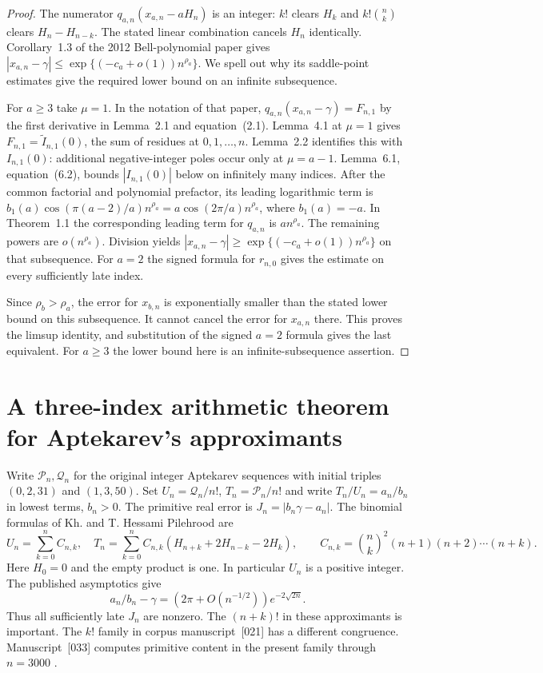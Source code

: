 \documentclass[11pt,a4paper,oneside,openany]{report}
\theoremstyle{remark}\newtheorem{remark}[theorem]{Remark}
\numberwithin{equation}{section}
\begin{document}
\begin{proof}
The numerator $q_{a,n}(x_{a,n}-aH_n)$ is an integer: $k!$
clears $H_k$ and $k!\binom nk$ clears $H_n-H_{n-k}$. The stated
linear combination cancels $H_n$ identically. Corollary~1.3 of the
2012 Bell-polynomial paper gives
$|x_{a,n}-\gamma|\le\exp\{(-c_a+o(1))n^{\rho_a}\}$.
We spell out why its saddle-point estimates give the required
lower bound on an infinite subsequence.

For $a\ge3$ take $\mu=1$. In the notation of that paper,
$q_{a,n}(x_{a,n}-\gamma)=F_{n,1}$ by the first derivative in
Lemma~2.1 and equation~(2.1). Lemma~4.1 at $\mu=1$ gives
$F_{n,1}=\widetilde I_{n,1}(0)$, the sum of residues at
$0,1,\ldots,n$. Lemma~2.2 identifies this with $I_{n,1}(0)$:
additional negative-integer poles occur only at $\mu=a-1$.
Lemma~6.1, equation~(6.2), bounds $|I_{n,1}(0)|$ below on infinitely
many indices. After the common factorial and polynomial prefactor,
its leading logarithmic term is
$b_1(a)\cos(\pi(a-2)/a)n^{\rho_a}=a\cos(2\pi/a)n^{\rho_a}$,
where $b_1(a)=-a$. In Theorem~1.1 the corresponding leading
term for $q_{a,n}$ is $a n^{\rho_a}$. The remaining powers are
$o(n^{\rho_a})$. Division yields
$|x_{a,n}-\gamma|\ge\exp\{(-c_a+o(1))n^{\rho_a}\}$ on that
subsequence. For $a=2$ the signed formula for $r_{n,0}$ gives
the estimate on every sufficiently late index.

Since $\rho_b>\rho_a$, the error for $x_{b,n}$ is exponentially
smaller than the stated lower bound on this subsequence. It cannot
cancel the error for $x_{a,n}$ there. This proves the limsup
identity, and substitution of the signed $a=2$ formula gives the
last equivalent. For $a\ge3$ the lower bound here is an
infinite-subsequence assertion.
\end{proof}

\section{A three-index arithmetic theorem for Aptekarev's approximants}
\label{ch3:sec:apt-three}
Write $\mathcal P_n,\mathcal Q_n$ for the original integer Aptekarev
sequences with initial triples $(0,2,31)$ and $(1,3,50)$.
Set $U_n=\mathcal Q_n/n!$, $T_n=\mathcal P_n/n!$ and write
$T_n/U_n=a_n/b_n$ in lowest terms, $b_n>0$.
The primitive real error is $J_n=|b_n\gamma-a_n|$.
The binomial formulas of Kh. and T. Hessami Pilehrood
\cite[Corollary~4]{apt-hhp} are
\[
 U_n=\sum_{k=0}^n C_{n,k},\quad
 T_n=\sum_{k=0}^n C_{n,k}(H_{n+k}+2H_{n-k}-2H_k),\qquad
 C_{n,k}=\binom nk^2(n+1)(n+2)\cdots(n+k).
\]
Here $H_0=0$ and the empty product is one. In particular $U_n$ is a
positive integer. The published asymptotics \cite[eqs.~(1)--(3)]{apt-hhp}
give
\begin{equation}\label{ch3:apt-rel}
 a_n/b_n-\gamma=(2\pi+O(n^{-1/2}))e^{-2\sqrt{2n}}.
\end{equation}
Thus all sufficiently late $J_n$ are nonzero. The $(n+k)!$ in these
approximants is important. The $k!$ family in corpus manuscript~[021]
has a different congruence. Manuscript~[033] computes primitive content
in the present family through $n=3000$ \cite{corpus}.
\end{document}
